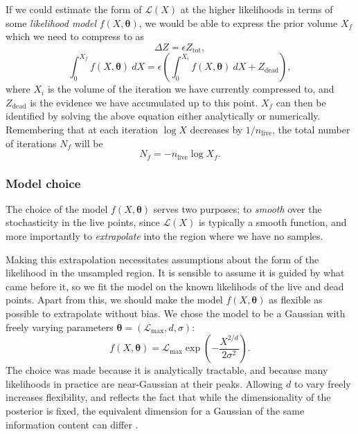 \documentclass[usenatbib]{mnras}
\newcommand{\thetab}{\bm{\theta}}
\newcommand{\nlive}{n_\mathrm{live}}
\newcommand{\Like}{\mathcal{L}}
\begin{document}
\par
If we could estimate the form of $\Like(X)$ at the higher likelihoods in terms of some \textit{likelihood model} $f(X, \thetab)$, we would be able to express the prior volume $X_f$ which we need to compress to as
\begin{equation}
	\Delta Z = \epsilon Z_\mathrm{tot},
\end{equation}
\begin{equation}\label{model endpoint}
	\int_0^{X_f} f(X, \thetab)\ dX = \epsilon \left( \int_0^{X_i} f(X, \thetab)\ dX + Z_\mathrm{dead} \right),
\end{equation}
where $X_i$ is the volume of the iteration we have currently compressed to, and $Z_\mathrm{dead}$ is the evidence we have accumulated up to this point. $X_f$ can then be identified by solving the above equation either analytically or numerically. Remembering that at each iteration $\log X$ decreases by $1/\nlive$, the total number of iterations $N_f$ will be
\begin{equation}
	N_f = - \nlive \log X_f .
\end{equation}

\subsubsection{Model choice}\label{sec:Model choice}
The choice of the model $f(X, \thetab)$ serves two purposes; to \textit{smooth} over the stochasticity in the live points, since $\Like(X)$ is typically a smooth function, and more importantly to \textit{extrapolate} into the region where we have no samples.
\par
Making this extrapolation necessitates assumptions about the form of the likelihood in the unsampled region. It is sensible to assume it is guided by what came before it, so we fit the model on the known likelihods of the live and dead points. Apart from this, we should make the model $f(X, \thetab)$ as flexible as possible to extrapolate without bias. We chose the model to be a Gaussian with freely varying parameters $\thetab = (\Like_\mathrm{max}, d, \sigma)$:
\begin{equation}
	f(X, \thetab) = \Like_\mathrm{max} \exp\left(-\frac{X^{2/d}}{2\sigma^2}\right).
\end{equation}
The choice was made because it is analytically tractable, and because many likelihoods in practice are near-Gaussian at their peaks. Allowing $d$ to vary freely increases flexibility, and reflects the fact that while the dimensionality of the posterior is fixed, the equivalent dimension for a Gaussian of the same information content can differ \citep{Handley_2019}.
\end{document}

